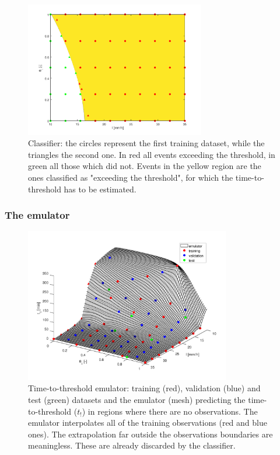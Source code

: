 \begin{figure}[h]
  \centering
  \includegraphics[width=0.7\textwidth]{Figures/classifier.png}
  \caption{Classifier: the circles represent the first training dataset, while the triangles the second one. In red all events exceeding the threshold, in green all those which did not. Events in the yellow region are the ones classified as "exceeding the threshold", for which the time-to-threshold has to be estimated.}
  \label{fig:classifier}
\end{figure}


\subsubsection{The emulator}
\begin{figure}[h]
  \centering
  \includegraphics[width=0.8\textwidth]{Figures/emulator.png}
  \caption{Time-to-threshold emulator: training (red), validation (blue) and test (green) datasets and the emulator (mesh) predicting the time-to-threshold ($t_!$) in regions where there are no observations. The emulator interpolates all of the training observations (red and blue ones). The extrapolation far outside the observations boundaries are meaningless. These are already discarded by the classifier.}
  \label{fig:emulator}
\end{figure}

